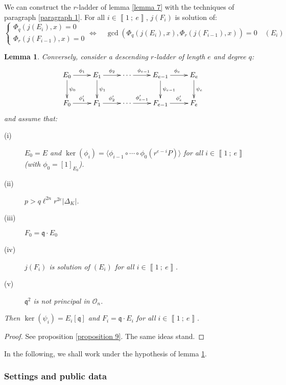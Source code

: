 \documentclass[a4paper,10pt]{report}
\theoremstyle{definition}
\theoremstyle{plain}
\newtheorem{lemma}[definition]{Lemma}
\theoremstyle{definition}
\newcommand{\mO}{\mathcal{O}}
\renewcommand{\i}[2]{\left\llbracket #1~;~#2\right\rrbracket}
\renewcommand{\(}{\left(}
\renewcommand{\)}{\right)}
\newcommand{\mf}[1]{\mathfrak{#1}}
\begin{document}
We can construct the $r$-ladder of lemma \ref{lemma 7} with the techniques of paragraph \ref{paragraph 1}. For all $i\in\i{1}{e}$, $j(F_i)$ is solution of:
\[\left\{\begin{array}{c}
\Phi_q(j(E_i),x)=0\\
\Phi_r(j(F_{i-1}),x)=0
\end{array}\right. \Longleftrightarrow \quad \gcd(\Phi_q(j(E_i),x),\Phi_r(j(F_{i-1}),x))=0\quad (E_i)\]

\begin{lemma}\label{lemma 6}
Conversely, consider a descending $r$-ladder of length $e$ and degree $q$:
\[\xymatrix{
E_0 \ar[d]^{\psi_0} \ar[r]^{\phi_1} & E_1\ar[d]^{\psi_1} \ar[r]^{\phi_{2}}& \cdots \ar[r]^{\phi_{e-1}} & E_{e-1} \ar[d]^{\psi_{e-1}} \ar[r]^{\phi_{e}} & E_e \ar[d]^{\psi_e}\\
F_0 \ar[r]^-{\phi'_1} & F_1 \ar[r]^-{\phi'_{2}}& \cdots \ar[r]^-{\phi'_{e-1}} & F_{e-1} \ar[r]^-{\phi'_{e}} & F_e
}\]
and assume that:
\begin{description}
\item[(i)] $E_0=E$ and $\ker(\phi_i)=\langle\phi_{i-1}\circ \cdots\circ\phi_0(r^{e-i}P)\rangle$ for all $i\in\i{1}{e}$ (with $\phi_0=[1]_{E_0}$).
\item[(ii)] $p>q\ell^{2n}r^{2e}|\Delta_K|$.
\item[(iii)] $F_0=\mf{q}\cdot E_0$
\item[(iv)] $j(F_i)$ is solution of $(E_i)$ for all $i\in\i{1}{e}$.
\item[(v)] $\mf{q}^2$ is not principal in $\mO_n$. 
\end{description}
Then $\ker(\psi_i)=E_i[\mf{q}]$ and $F_i=\mf{q}\cdot E_i$ for all $i\in\i{1}{e}$.
\end{lemma}

\begin{proof}
See proposition \ref{proposition 9}. The same ideas stand.
\end{proof}

In the following, we shall work under the hypothesis of lemma \ref{lemma 6}.

\subsubsection{Settings and public data}
\end{document}
